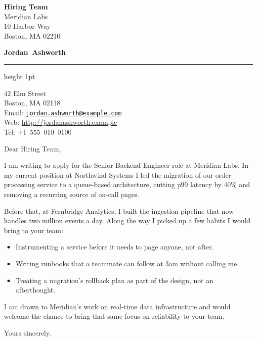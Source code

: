 \documentclass[a4paper, 11pt]{letter}
\date{\today} %
\makeatletter
\newcommand{\covertitle}{Jordan~Ashworth}                %
\newcommand{\authoraddress}{                            %
    42 Elm Street \\
    Boston, MA 02118}
\newcommand{\authorweb}{http://jordanashworth.example}  %
\newcommand{\authoremail}{jordan.ashworth@example.com}  %
\newcommand{\authortel}{+1~555~010~0100}                %
\makeatother
\begin{document}
\signature{Jordan Ashworth}     %

\longindentation=0pt            %
\let\raggedleft\raggedright     %

\renewcommand{\labelitemi}{$\vcenter{\hbox{\tiny$\bullet$}}$}


\newcommand{\makecovertitle}{
    \begin{center}
    {\Large\bf \covertitle}
    \end{center}
    \smallskip\hrule height 1pt
}

\newcommand{\contact}{
    \begin{center}
    \authoraddress \\
    Email: \href{mailto:\authoremail}{\texttt{\authoremail}} \\
    Web: \url{\authorweb}\\
    Tel: \authortel
    \end{center}
}


\begin{letter}
{   %
\textbf{Hiring Team} \\
Meridian Labs \\
10 Harbor Way \\
Boston, MA 02210
}

\makecovertitle

\contact

\opening{Dear Hiring Team,}

I am writing to apply for the Senior Backend Engineer role at Meridian
Labs. In my current position at Northwind Systems I led the migration of
our order-processing service to a queue-based architecture, cutting p99
latency by 40\% and removing a recurring source of on-call pages.

Before that, at Fernbridge Analytics, I built the ingestion pipeline
that now handles two million events a day. Along the way I picked up a
few habits I would bring to your team:

\begin{itemize}
    \item Instrumenting a service before it needs to page anyone, not after.
    \item Writing runbooks that a teammate can follow at 3am without calling me.
    \item Treating a migration's rollback plan as part of the design, not an afterthought.
\end{itemize}

I am drawn to Meridian's work on real-time data infrastructure and would
welcome the chance to bring that same focus on reliability to your team.

\closing{Yours sincerely,}


\end{letter}
\end{document}
